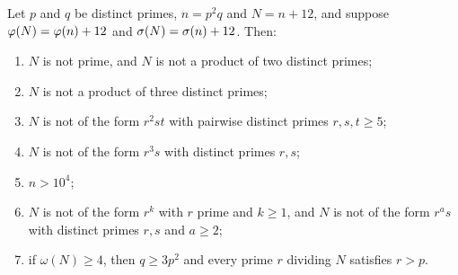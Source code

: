 \begin{theorem}
\label{thm:L2}
Let \(p\) and \(q\) be distinct primes, \(n=p^2q\) and \(N=n+12\), and suppose \(\varphi(N)=\varphi(n)+12\) and \(\sigma(N)=\sigma(n)+12\). Then:
\begin{enumerate}
\item[\textup{(i)}] \(N\) is not prime, and \(N\) is not a product of two distinct primes;
\item[\textup{(ii)}] \(N\) is not a product of three distinct primes;
\item[\textup{(iii)}] \(N\) is not of the form \(r^2st\) with pairwise distinct primes \(r,s,t\ge 5\);
\item[\textup{(iv)}] \(N\) is not of the form \(r^3s\) with distinct primes \(r,s\);
\item[\textup{(v)}] \(n>10^4\);
\item[\textup{(vi)}] \(N\) is not of the form \(r^k\) with \(r\) prime and \(k\ge 1\), and \(N\) is not of the form \(r^as\) with distinct primes \(r,s\) and \(a\ge 2\);
\item[\textup{(vii)}] if \(\omega(N)\ge 4\), then \(q\ge 3p^2\) and every prime \(r\) dividing \(N\) satisfies \(r>p\).
\end{enumerate}
\end{theorem}
